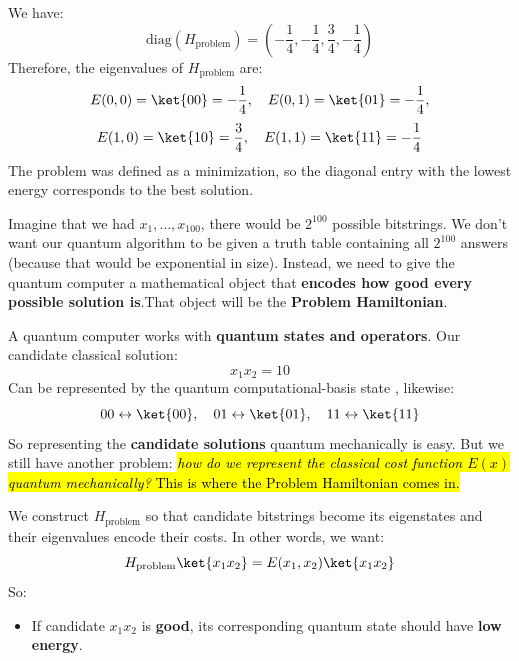 We have:
\begin{equation*}
    \mathrm{diag}\left(H_{\text{problem}}\right) = \left(
        -\frac{1}{4}, -\frac{1}{4}, \frac{3}{4}, -\frac{1}{4}
    \right)
\end{equation*}
Therefore, the eigenvalues of $H_{\text{problem}}$ are:
\begin{equation*}
    E(0,0) = \ket{00} = -\frac{1}{4}, \quad
    E(0,1) = \ket{01} = -\frac{1}{4},
\end{equation*}
\begin{equation*}
    E(1,0) = \ket{10} = \frac{3}{4}, \quad
    E(1,1) = \ket{11} = -\frac{1}{4}
\end{equation*}
The problem was defined as a minimization, so the diagonal entry with the lowest energy corresponds to the best solution.

\begin{deepeningbox}
    Imagine that we had $x_1, \dots, x_{100}$, there would be $2^{100}$ possible bitstrings. We don't want our quantum algorithm to be given a truth table containing all $2^{100}$ answers (because that would be exponential in size). Instead, we need to give the quantum computer a mathematical object that \textbf{encodes how good every possible solution is}.That object will be the \textbf{Problem Hamiltonian}.

    \highspace
    A quantum computer works with \textbf{quantum states and operators}. Our candidate classical solution:
    \begin{equation*}
        x_1 x_2 = 10
    \end{equation*}
    Can be represented by the quantum computational-basis state , likewise:
    \begin{equation*}
        00 \leftrightarrow \ket{00}, \quad 01 \leftrightarrow \ket{01}, \quad 11 \leftrightarrow \ket{11}
    \end{equation*}
    So representing the \textbf{candidate solutions} quantum mechanically is easy. But we still have another problem: \hl{\emph{how do we represent the classical cost function $E(x)$ quantum mechanically?} This is where the Problem Hamiltonian comes in.}

    \highspace
    We construct $H_{\text{problem}}$ so that candidate bitstrings become its eigenstates and their eigenvalues encode their costs. In other words, we want:
    \begin{equation*}
        H_{\text{problem}}\ket{x_1 x_2} = E(x_1, x_2)\ket{x_1 x_2}
    \end{equation*}
    So:
    \begin{itemize}
        \item[\textcolor{Green3}{\faIcon{check}}] If candidate $x_1 x_2$ is \textbf{good}, its corresponding quantum state should have \textbf{low energy}.


\end{itemize}
\end{deepeningbox}
